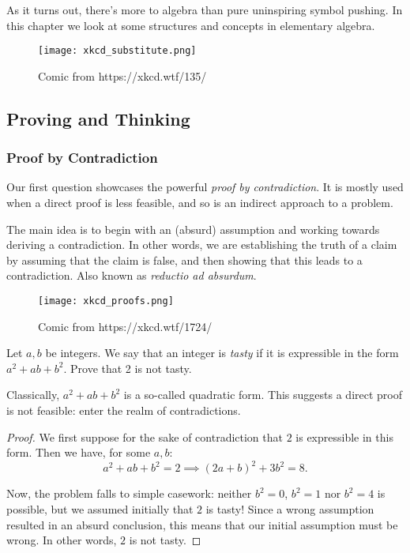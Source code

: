\documentclass[../main.tex]{subfiles}
\begin{document}
As it turns out, there's more to algebra than pure uninspiring symbol pushing. In this chapter we look at some structures and concepts in elementary algebra.

\begin{figure}[H]
    \centering
    \texttt{[image: xkcd\_substitute.png]}
    \caption{Comic from https://xkcd.wtf/135/}
\end{figure}

\subsection{Proving and Thinking}
\subsubsection{Proof by Contradiction}
Our first question showcases the powerful \textit{proof by contradiction}. It is mostly used when a direct proof is less feasible, and so is an indirect approach to a problem.

The main idea is to begin with an (absurd) assumption and working towards deriving a contradiction. In other words, we are establishing the truth of a claim by assuming that the claim is false, and then showing that this leads to a contradiction. Also known as \textit{reductio ad absurdum}.
\begin{figure}[H]
    \centering
    \texttt{[image: xkcd\_proofs.png]}
    \caption{Comic from https://xkcd.wtf/1724/}
\end{figure}

\begin{example}[Classic]
Let $a, b$ be integers. We say that an integer is \textit{tasty} if it is expressible in the form $a^2+ab+b^2$. Prove that 2 is not tasty.
\end{example}
Classically, $a^2+ab+b^2$ is a so-called quadratic form. This suggests a direct proof is not feasible: enter the realm of contradictions.

\begin{proof}
We first suppose for the sake of contradiction that $2$ is expressible in this form. Then we have, for some $a,b$: 
$$a^2+ab+b^2=2 \implies (2a+b)^2+3b^2=8.$$

Now, the problem falls to simple casework: neither $b^2=0$, $b^2=1$ nor $b^2=4$ is possible, but we assumed initially that $2$ is tasty! Since a wrong assumption resulted in an absurd conclusion, this means that our initial assumption must be wrong. In other words, $2$ is not tasty.
\end{proof}
\end{document}
